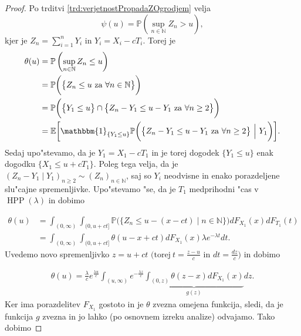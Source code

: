 \documentclass[12pt, a4paper, reqno]{amsart}
\theoremstyle{definition}
\theoremstyle{plain}
\newcommand{\N}{\mathbb{N}}
\newcommand{\E}{\mathbb{E}}
\newcommand{\Prob}{\mathbb{P}}
\newcommand{\1}{\mathds{1}}
\DeclareMathOperator{\HPP}{HPP}
\begin{document}
    \begin{proof}
        Po trditvi \ref{trd:verjetnostPropadaZOgrodjem} velja
        \begin{equation*}
            \psi(u) = \Prob\left(\sup_{n\in\N}Z_n > u\right),
        \end{equation*}
        kjer je $Z_n = \sum_{i=1}^nY_i$ in $Y_i = X_i - cT_i$. Torej je
        \begin{align*}
            \theta(u) &= \Prob\left(\sup_{n\in\N}Z_n \leq u\right) \\
                      &= \Prob\biggl(\bigl\{Z_n \leq u \ \text{za} \ \forall n\in\N\bigr\}\biggr) \\
                      &= \Prob\biggl(\bigl\{Y_1 \leq u\bigr\}\cap \bigl\{Z_n - Y_1 \leq u - Y_1 \ \text{za} \ \forall n\geq2\bigr\}\biggr) \\
                      &= \E\biggl[\mathbbm{1}_{\{Y_1\leq u\}}\Prob\biggl(\bigl\{Z_n - Y_1 \leq u - Y_1 \ \text{za} \ \forall n\geq2\bigr\} \ \Big| \ Y_1\biggr)\biggr].
        \end{align*}
        Sedaj upo"stevamo, da je $Y_1 = X_1 - cT_1$ in je torej dogodek $\{Y_1 \leq u\}$ 
        enak dogodku $\{X_1 \leq u + cT_1\}$. Poleg tega velja, da je 
        $(Z_n - Y_1\mid Y_1)_{n\geq2} \sim (Z_n)_{n\in\N}$, saj so $Y_i$ neodvisne in enako porazdeljene
        slu"cajne spremenljivke.
        Upo"stevamo "se, da je  $T_1$ medprihodni "cas v $\HPP(\lambda)$ in dobimo

        \begin{align*}
                \theta(u)   &= \int_{(0, \infty)}\int_{(0, u + ct]}\Prob\biggl(\bigl\{Z_n \leq u - (x - ct)\mid n\in\N\bigr\}\biggr)dF_{X_1}(x)dF_{T_1}(t) \\
                            &= \int_{(0, \infty)}\int_{(0, u + ct]}\theta(u - x + ct)dF_{X_1}(x)\lambda e^{-\lambda t}dt.
        \end{align*}
        Uvedemo novo spremenljivko $z = u + ct$ $\bigl( \text{torej} \ t = \tfrac{z - u}{c}$ in $dt = \tfrac{dz}{c} \bigr)$ 
        in dobimo

        \begin{align*}
                    \theta(u) = \frac{\lambda}{c}e^{\frac{\lambda u}{c}}\int_{(u, \infty)}e^{-\frac{\lambda z}{c}}\underbrace{\int_{(0, z)}\theta(z - x)dF_{X_1}(x)}_{g(z)}dz.
        \end{align*}
        Ker ima porazdelitev $F_{X_1}$ gostoto in je $\theta$ zvezna omejena funkcija,
        sledi, da je funkcija $g$ zvezna in jo lahko (po osnovnem izreku analize)
        odvajamo. Tako dobimo


\end{proof}
\end{document}
